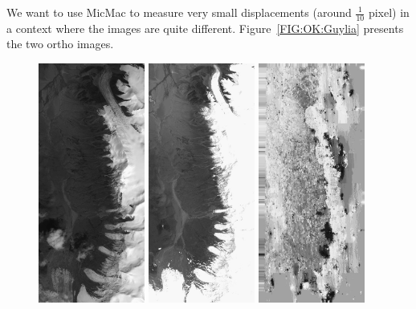 We want to use MicMac to measure very small displacements (around $\frac{1}{10}$ pixel) in
a context where the images are quite different. Figure~\ref{FIG:OK:Guylia} presents the two
ortho images.

\begin{figure}
\begin{center}
\includegraphics[width=35mm]{FIGS/SeismGuylia/250802_ortho.jpg}
\includegraphics[width=35mm]{FIGS/SeismGuylia/260608_ortho.jpg}
\includegraphics[width=35mm]{FIGS/SeismGuylia/Px1.jpg}

\end{center}
\end{figure}
